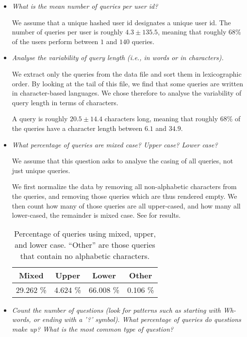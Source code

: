 \begin{itemize}

\item \emph{What is the mean number of queries per user id?}

We assume that a unique hashed user id designates a unique user id.
The number of queries per user is roughly $4.3\pm135.5$, meaning that roughly
68\% of the users perform between $1$ and $140$ queries.

\item \emph{Analyse the variability of query length (i.e., in words or in
characters).}

We extract only the queries from the data file and sort them in lexicographic
order. By looking at the tail of this file, we find that some queries are
written in character-based languages. We chose therefore to analyse the
variability of query length in terms of characters.

A query is roughly $20.5\pm 14.4$ characters long, meaning that roughly 68\% of
the queries have a character length between $6.1$ and $34.9$.

\item \emph{What percentage of queries are mixed case? Upper case? Lower case?}

We assume that this question asks to analyse the casing of all queries, not
just unique queries.

We first normalize the data by removing all non-alphabetic characters from the
queries, and removing those queries which are thus rendered empty. We then
count how many of those queries are all upper-cased, and how many all
lower-cased, the remainder is mixed case. See  for
results.

\begin{table}[h!]
\centering
\begin{tabular}{|c|c|c|c|}
\hline
\textbf{Mixed} & \textbf{Upper} & \textbf{Lower} & \textbf{Other} \\
\hline
29.262 \%      & 4.624 \%       & 66.008 \%      & 0.106 \% \\
\hline
\end{tabular}
\caption[]{Percentage of queries using mixed, upper, and lower case. ``Other''
are those queries that contain no alphabetic characters.}
\label{table:casing}
\end{table}

\item \emph{Count the number of questions (look for patterns such as starting
with Wh-words, or ending with a '?'    symbol). What percentage of queries do
questions make up? What is the most common type of question?}


\end{itemize}
